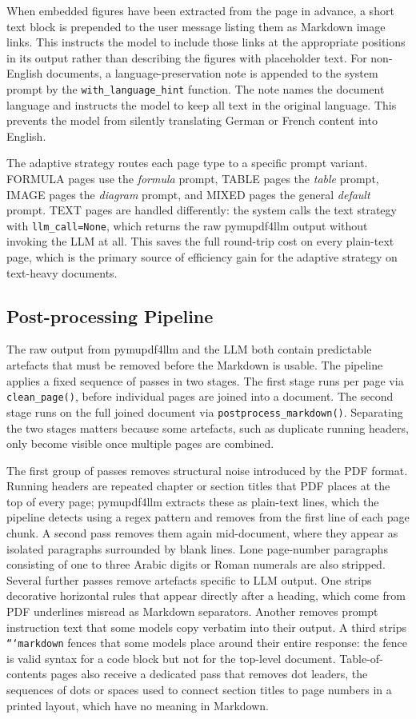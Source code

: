 \documentclass[12pt]{article}
\begin{document}
When embedded figures have been extracted from the page in advance, a short text block is prepended to the user message listing them as Markdown image links.
This instructs the model to include those links at the appropriate positions in its output rather than describing the figures with placeholder text.
For non-English documents, a language-preservation note is appended to the system prompt by the \texttt{with\_language\_hint} function.
The note names the document language and instructs the model to keep all text in the original language.
This prevents the model from silently translating German or French content into English.

The adaptive strategy routes each page type to a specific prompt variant.
FORMULA pages use the \textit{formula} prompt, TABLE pages the \textit{table} prompt, IMAGE pages the \textit{diagram} prompt, and MIXED pages the general \textit{default} prompt.
TEXT pages are handled differently: the system calls the text strategy with \texttt{llm\_call=None}, which returns the raw pymupdf4llm output without invoking the LLM at all.
This saves the full round-trip cost on every plain-text page, which is the primary source of efficiency gain for the adaptive strategy on text-heavy documents.

\subsection{Post-processing Pipeline}

The raw output from pymupdf4llm and the LLM both contain predictable artefacts that must be removed before the Markdown is usable.
The pipeline applies a fixed sequence of passes in two stages.
The first stage runs per page via \texttt{clean\_page()}, before individual pages are joined into a document.
The second stage runs on the full joined document via \texttt{postprocess\_markdown()}.
Separating the two stages matters because some artefacts, such as duplicate running headers, only become visible once multiple pages are combined.

The first group of passes removes structural noise introduced by the PDF format.
Running headers are repeated chapter or section titles that PDF places at the top of every page; pymupdf4llm extracts these as plain-text lines, which the pipeline detects using a regex pattern and removes from the first line of each page chunk.
A second pass removes them again mid-document, where they appear as isolated paragraphs surrounded by blank lines.
Lone page-number paragraphs consisting of one to three Arabic digits or Roman numerals are also stripped.
Several further passes remove artefacts specific to LLM output.
One strips decorative horizontal rules that appear directly after a heading, which come from PDF underlines misread as Markdown separators.
Another removes prompt instruction text that some models copy verbatim into their output.
A third strips \texttt{```markdown} fences that some models place around their entire response: the fence is valid syntax for a code block but not for the top-level document.
Table-of-contents pages also receive a dedicated pass that removes dot leaders, the sequences of dots or spaces used to connect section titles to page numbers in a printed layout, which have no meaning in Markdown.
\end{document}
